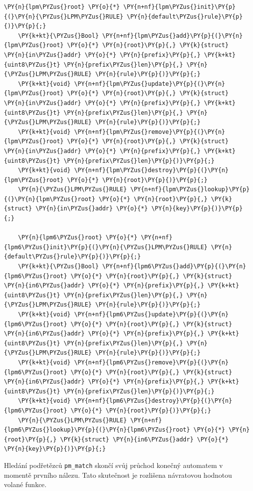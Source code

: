 \begin{Verbatim}[commandchars=\\\{\}]
\PY{n}{lpm\PYZus{}root} \PY{o}{*} \PY{n+nf}{lpm\PYZus{}init}\PY{p}{(}\PY{n}{\PYZus{}LPM\PYZus{}RULE} \PY{n}{default\PYZus{}rule}\PY{p}{)}\PY{p}{;}
	\PY{k+kt}{\PYZus{}Bool} \PY{n+nf}{lpm\PYZus{}add}\PY{p}{(}\PY{n}{lpm\PYZus{}root} \PY{o}{*} \PY{n}{root}\PY{p}{,} \PY{k}{struct} \PY{n}{in\PYZus{}addr} \PY{o}{*} \PY{n}{prefix}\PY{p}{,} \PY{k+kt}{uint8\PYZus{}t} \PY{n}{prefix\PYZus{}len}\PY{p}{,} \PY{n}{\PYZus{}LPM\PYZus{}RULE} \PY{n}{rule}\PY{p}{)}\PY{p}{;}
	\PY{k+kt}{void} \PY{n+nf}{lpm\PYZus{}update}\PY{p}{(}\PY{n}{lpm\PYZus{}root} \PY{o}{*} \PY{n}{root}\PY{p}{,} \PY{k}{struct} \PY{n}{in\PYZus{}addr} \PY{o}{*} \PY{n}{prefix}\PY{p}{,} \PY{k+kt}{uint8\PYZus{}t} \PY{n}{prefix\PYZus{}len}\PY{p}{,} \PY{n}{\PYZus{}LPM\PYZus{}RULE} \PY{n}{rule}\PY{p}{)}\PY{p}{;}
	\PY{k+kt}{void} \PY{n+nf}{lpm\PYZus{}remove}\PY{p}{(}\PY{n}{lpm\PYZus{}root} \PY{o}{*} \PY{n}{root}\PY{p}{,} \PY{k}{struct} \PY{n}{in\PYZus{}addr} \PY{o}{*} \PY{n}{prefix}\PY{p}{,} \PY{k+kt}{uint8\PYZus{}t} \PY{n}{prefix\PYZus{}len}\PY{p}{)}\PY{p}{;}
	\PY{k+kt}{void} \PY{n+nf}{lpm\PYZus{}destroy}\PY{p}{(}\PY{n}{lpm\PYZus{}root} \PY{o}{*} \PY{n}{root}\PY{p}{)}\PY{p}{;}
	\PY{n}{\PYZus{}LPM\PYZus{}RULE} \PY{n+nf}{lpm\PYZus{}lookup}\PY{p}{(}\PY{n}{lpm\PYZus{}root} \PY{o}{*} \PY{n}{root}\PY{p}{,} \PY{k}{struct} \PY{n}{in\PYZus{}addr} \PY{o}{*} \PY{n}{key}\PY{p}{)}\PY{p}{;}

	\PY{n}{lpm6\PYZus{}root} \PY{o}{*} \PY{n+nf}{lpm6\PYZus{}init}\PY{p}{(}\PY{n}{\PYZus{}LPM\PYZus{}RULE} \PY{n}{default\PYZus{}rule}\PY{p}{)}\PY{p}{;}
	\PY{k+kt}{\PYZus{}Bool} \PY{n+nf}{lpm6\PYZus{}add}\PY{p}{(}\PY{n}{lpm6\PYZus{}root} \PY{o}{*} \PY{n}{root}\PY{p}{,} \PY{k}{struct} \PY{n}{in6\PYZus{}addr} \PY{o}{*} \PY{n}{prefix}\PY{p}{,} \PY{k+kt}{uint8\PYZus{}t} \PY{n}{prefix\PYZus{}len}\PY{p}{,} \PY{n}{\PYZus{}LPM\PYZus{}RULE} \PY{n}{rule}\PY{p}{)}\PY{p}{;}
	\PY{k+kt}{void} \PY{n+nf}{lpm6\PYZus{}update}\PY{p}{(}\PY{n}{lpm6\PYZus{}root} \PY{o}{*} \PY{n}{root}\PY{p}{,} \PY{k}{struct} \PY{n}{in6\PYZus{}addr} \PY{o}{*} \PY{n}{prefix}\PY{p}{,} \PY{k+kt}{uint8\PYZus{}t} \PY{n}{prefix\PYZus{}len}\PY{p}{,} \PY{n}{\PYZus{}LPM\PYZus{}RULE} \PY{n}{rule}\PY{p}{)}\PY{p}{;}
	\PY{k+kt}{void} \PY{n+nf}{lpm6\PYZus{}remove}\PY{p}{(}\PY{n}{lpm6\PYZus{}root} \PY{o}{*} \PY{n}{root}\PY{p}{,} \PY{k}{struct} \PY{n}{in6\PYZus{}addr} \PY{o}{*} \PY{n}{prefix}\PY{p}{,} \PY{k+kt}{uint8\PYZus{}t} \PY{n}{prefix\PYZus{}len}\PY{p}{)}\PY{p}{;}
	\PY{k+kt}{void} \PY{n+nf}{lpm6\PYZus{}destroy}\PY{p}{(}\PY{n}{lpm6\PYZus{}root} \PY{o}{*} \PY{n}{root}\PY{p}{)}\PY{p}{;}
	\PY{n}{\PYZus{}LPM\PYZus{}RULE} \PY{n+nf}{lpm6\PYZus{}lookup}\PY{p}{(}\PY{n}{lpm6\PYZus{}root} \PY{o}{*} \PY{n}{root}\PY{p}{,} \PY{k}{struct} \PY{n}{in6\PYZus{}addr} \PY{o}{*} \PY{n}{key}\PY{p}{)}\PY{p}{;}
\end{Verbatim}
Hledání podřetězců \texttt{pm\_match} skončí svůj průchod konečný automatem v momentě prvního nálezu.
Tato skutečnost je rozlišena návratovou hodnotou volané funkce.

